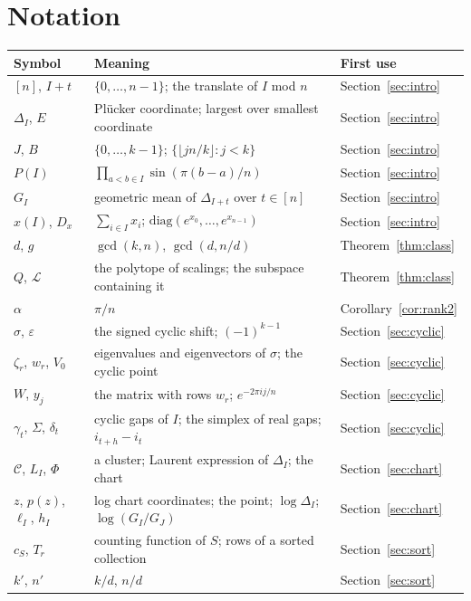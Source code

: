 \documentclass[11pt]{article}
\theoremstyle{remark}
\begin{document}
\section{Notation}\label{app:notation}
\begin{center}
\begin{tabular}{lp{8.6cm}l}
\toprule
Symbol & Meaning & First use\\
\midrule
$[n]$, $I+t$ & $\{0,\dots,n-1\}$; the translate of $I$ mod $n$ & Section~\ref{sec:intro}\\
$\Delta_I$, $E$ & Pl\"ucker coordinate; largest over smallest coordinate & Section~\ref{sec:intro}\\
$J$, $B$ & $\{0,\dots,k-1\}$; $\{\lfloor jn/k\rfloor:j<k\}$ & Section~\ref{sec:intro}\\
$P(I)$ & $\prod_{a<b\in I}\sin(\pi(b-a)/n)$ & Section~\ref{sec:intro}\\
$G_I$ & geometric mean of $\Delta_{I+t}$ over $t\in[n]$ & Section~\ref{sec:intro}\\
$x(I)$, $D_x$ & $\sum_{i\in I}x_i$; $\mathrm{diag}(e^{x_0},\dots,e^{x_{n-1}})$ & Section~\ref{sec:intro}\\
$d$, $g$ & $\gcd(k,n)$, $\gcd(d,n/d)$ & Theorem~\ref{thm:class}\\
$Q$, $\mathcal{L}$ & the polytope of scalings; the subspace containing it & Theorem~\ref{thm:class}\\
$\alpha$ & $\pi/n$ & Corollary~\ref{cor:rank2}\\
$\sigma$, $\varepsilon$ & the signed cyclic shift; $(-1)^{k-1}$ & Section~\ref{sec:cyclic}\\
$\zeta_r$, $w_r$, $V_0$ & eigenvalues and eigenvectors of $\sigma$; the cyclic point & Section~\ref{sec:cyclic}\\
$W$, $y_j$ & the matrix with rows $w_r$; $e^{-2\pi ij/n}$ & Section~\ref{sec:cyclic}\\
$\gamma_t$, $\Sigma$, $\delta_t$ & cyclic gaps of $I$; the simplex of real gaps; $i_{t+h}-i_t$ & Section~\ref{sec:cyclic}\\
$\mathcal{C}$, $L_I$, $\Phi$ & a cluster; Laurent expression of $\Delta_I$; the chart & Section~\ref{sec:chart}\\
$z$, $p(z)$, $\ell_I$, $h_I$ & log chart coordinates; the point; $\log\Delta_I$; $\log(G_I/G_J)$ & Section~\ref{sec:chart}\\
$c_S$, $T_r$ & counting function of $S$; rows of a sorted collection & Section~\ref{sec:sort}\\
$k'$, $n'$ & $k/d$, $n/d$ & Section~\ref{sec:sort}\\

\end{tabular}
\end{center}
\end{document}

